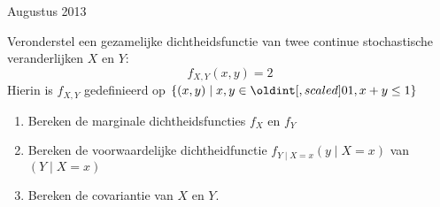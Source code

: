 \documentclass[main.tex]{subfiles}
\begin{document}
\begin{examenvraag}{Augustus 2013}
  \begin{ex-vraag}
    Veronderstel een gezamelijke dichtheidsfunctie van twee continue stochastische veranderlijken $X$ en $Y$:
    \[ f_{X,Y}(x,y) = 2 \]
    Hierin is $f_{X,Y}$ gedefinieerd op $\{ (x,y) \mid x,y\in \interval{0}{1}, x+y \le 1 \}$
    \begin{enumerate}
    \item Bereken de marginale dichtheidsfuncties $f_{X}$ en $f_{Y}$
    \item Bereken de voorwaardelijke dichtheidfunctie $f_{Y\mid X=x}(y\mid X=x)$ van $(Y \mid X = x)$
    \item Bereken de covariantie van $X$ en $Y$.
    \end{enumerate}
  \end{ex-vraag}
  

\end{examenvraag}
\end{document}
